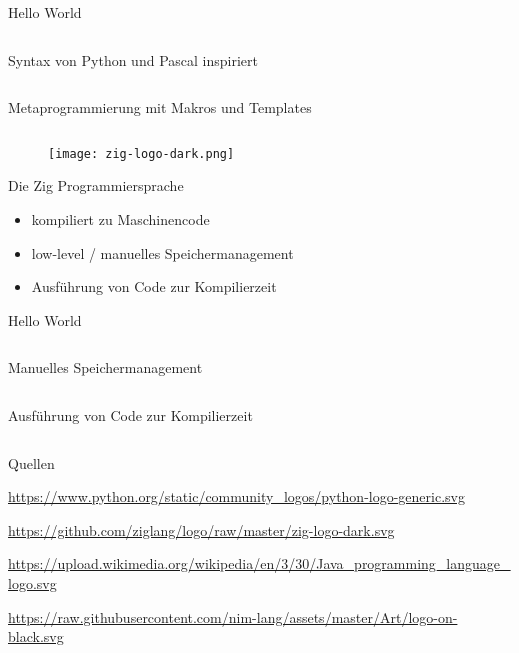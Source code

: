 \documentclass[aspectratio=169]{beamer}
\begin{document}
\begin{frame}{Hello World}
  \inputminted[linenos]{nim}{examples/hello.nim}
\end{frame}

\begin{frame}{Syntax von Python und Pascal inspiriert}
  \inputminted[linenos]{nim}{examples/syntax.nim}
\end{frame}

\begin{frame}{Metaprogrammierung mit Makros und Templates}
  \inputminted[linenos]{nim}{examples/templates.nim}
\end{frame}

\begin{frame}{}
  \begin{figure}
    \centering
    \texttt{[image: zig-logo-dark.png]}
    \caption{\cite{zig_logo}}
    \label{fig:zig_logo}
  \end{figure}
\end{frame}

\begin{frame}{Die Zig Programmiersprache}
  \begin{itemize}
  \item kompiliert zu Maschinencode
  \item low-level / manuelles Speichermanagement
  \item Ausführung von Code zur Kompilierzeit
  \end{itemize}
\end{frame}

\begin{frame}{Hello World}
  \inputminted[linenos]{zig}{examples/hello.zig}
\end{frame}

\begin{frame}{Manuelles Speichermanagement}
  \inputminted[linenos]{zig}{examples/memory_management.zig}
\end{frame}

\begin{frame}{Ausführung von Code zur Kompilierzeit}
  \inputminted[linenos]{zig}{examples/comptime.zig}
\end{frame}

\begin{frame}{Quellen}
  \begin{thebibliography}{}
    \url{https://www.python.org/static/community_logos/python-logo-generic.svg}

    \url{https://github.com/ziglang/logo/raw/master/zig-logo-dark.svg}

    \url{https://upload.wikimedia.org/wikipedia/en/3/30/Java_programming_language_logo.svg}

    \url{https://raw.githubusercontent.com/nim-lang/assets/master/Art/logo-on-black.svg}

  \end{thebibliography}
\end{frame}
\end{document}
